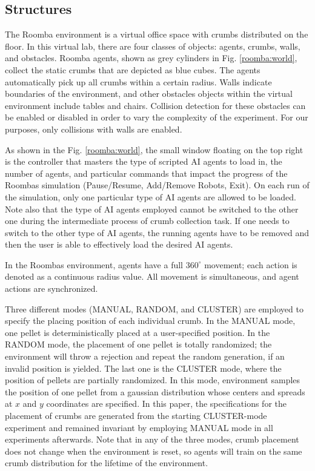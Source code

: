 \documentclass[conference]{IEEEtran}
\begin{document}
\subsection{Structures}
The Roomba environment is a virtual office space with crumbs distributed on
the floor.
In this virtual lab, there are four classes of objects: agents, crumbs, walls,
and obstacles. 
Roomba agents, shown as grey cylinders in Fig. \ref{roomba:world}, collect the static crumbs that are depicted as blue cubes.  The
agents automatically pick up all crumbs within a certain radius. 
Walls indicate boundaries of the environment, and other obstacles objects within the virtual environment include tables and chairs. Collision detection for these obstacles can be enabled or disabled in order to vary the complexity of the experiment. For our purposes, only collisions with walls are enabled.

As shown in the Fig. \ref{roomba:world}, the small window floating on the top right
is the controller that masters the type of scripted AI agents to load in, the
number of agents, and particular commands that impact the progress of the
Roombas simulation (Pause/Resume, Add/Remove Robots, Exit). On each run of the
simulation, only one particular type of AI agents are allowed to be loaded.
Note also that the type of AI agents employed cannot be switched to the other
one during the intermediate process of crumb collection task. 
If one needs to switch to the other type of AI agents, the running agents have
to be removed and then the user is able to effectively load the desired AI agents.


In the Roombas environment, agents have a full $360^\circ$ movement; each action is
denoted as a continuous radius value. All movement is simultaneous, and agent actions are synchronized. 


Three different modes (MANUAL, RANDOM, and CLUSTER) are employed to specify
the placing position of each individual crumb.
In the MANUAL mode, one pellet is deterministically placed at a user-specified
position. 
In the RANDOM mode, the placement of one pellet is totally randomized; the
environment will throw a rejection and repeat the random generation, if an
invalid position is yielded. The last one is the CLUSTER mode, where the
position of pellets are partially randomized. In this mode,
environment samples the position of one pellet from a gaussian distribution
whose centers and spreads at $x$ and $y$ coordinates are specified. 
In this paper, the specifications for the placement of crumbs are generated
from the starting CLUSTER-mode experiment and remained invariant by
employing MANUAL mode in all experiments afterwards.
Note that in any of the three modes, crumb placement does not change when the environment is reset, so agents will train on the same crumb distribution for the lifetime of the environment.
\end{document}
